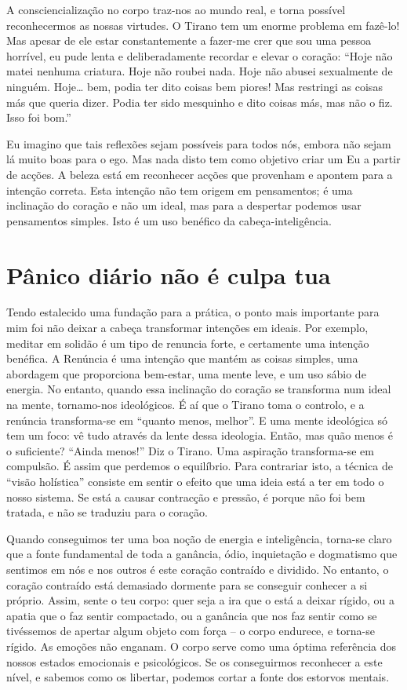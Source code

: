 A consciencialização no corpo traz-nos ao mundo real, e torna possível
reconhecermos as nossas virtudes. O Tirano tem um enorme problema em
fazê-lo! Mas apesar de ele estar constantemente a fazer-me crer que sou
uma pessoa horrível, eu pude lenta e deliberadamente recordar e elevar o
coração: “Hoje não matei nenhuma criatura. Hoje não roubei nada. Hoje
não abusei sexualmente de ninguém. Hoje\ldots{} bem, podia ter dito coisas
bem piores! Mas restringi as coisas más que queria dizer. Podia ter sido
mesquinho e dito coisas más, mas não o fiz. Isso foi bom.”

Eu imagino que tais reflexões sejam possíveis para todos nós, embora não
sejam lá muito boas para o ego. Mas nada disto tem como objetivo criar
um Eu a partir de acções. A beleza está em reconhecer acções que
provenham e apontem para a intenção correta. Esta intenção não tem
origem em pensamentos; é uma inclinação do coração e não um ideal, mas
para a despertar podemos usar pensamentos simples. Isto é um uso
benéfico da cabeça-inteligência.

\section{Pânico diário não é culpa
tua}

Tendo estalecido uma fundação para a prática, o ponto mais importante
para mim foi não deixar a cabeça transformar intenções em ideais. Por
exemplo, meditar em solidão é um tipo de renuncia forte, e certamente
uma intenção benéfica. A Renúncia é uma intenção que mantém as coisas
simples, uma abordagem que proporciona bem-estar, uma mente leve, e um
uso sábio de energia. No entanto, quando essa inclinação do coração se
transforma num ideal na mente, tornamo-nos ideológicos. É aí que o
Tirano toma o controlo, e a renúncia transforma-se em “quanto menos,
melhor”. E uma mente ideológica só tem um foco: vê tudo através da lente
dessa ideologia. Então, mas quão menos é o suficiente? “Ainda menos!”
Diz o Tirano. Uma aspiração transforma-se em compulsão. É assim que
perdemos o equilíbrio. Para contrariar isto, a técnica de “visão
holística” consiste em sentir o efeito que uma ideia está a ter em todo
o nosso sistema. Se está a causar contracção e pressão, é porque não foi
bem tratada, e não se traduziu para o coração.

Quando conseguimos ter uma boa noção de energia e inteligência, torna-se
claro que a fonte fundamental de toda a ganância, ódio, inquietação e
dogmatismo que sentimos em nós e nos outros é este coração contraído e
dividido. No entanto, o coração contraído está demasiado dormente para
se conseguir conhecer a si próprio. Assim, sente o teu corpo: quer seja
a ira que o está a deixar rígido, ou a apatia que o faz sentir
compactado, ou a ganância que nos faz sentir como se tivéssemos de
apertar algum objeto com força -- o corpo endurece, e torna-se rígido.
As emoções não enganam. O corpo serve como uma óptima referência dos
nossos estados emocionais e psicológicos. Se os conseguirmos reconhecer
a este nível, e sabemos como os libertar, podemos cortar a fonte dos
estorvos mentais.

